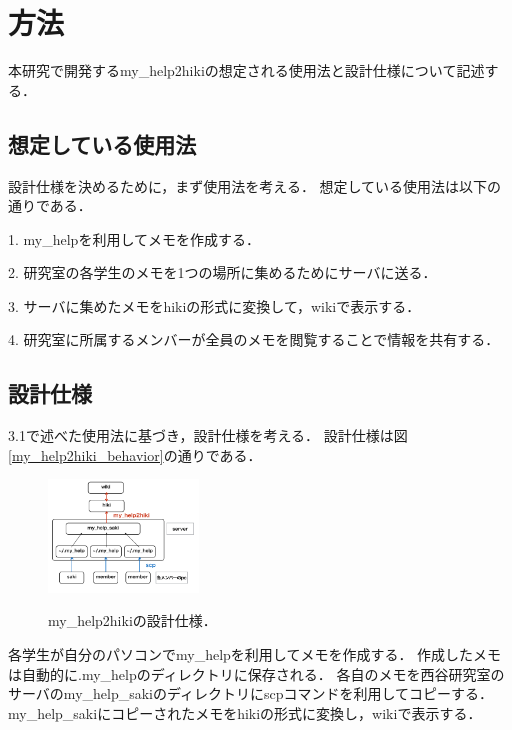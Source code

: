 \section{方法}
本研究で開発するmy\_help2hikiの想定される使用法と設計仕様について記述する．

\subsection{想定している使用法}
設計仕様を決めるために，まず使用法を考える．
想定している使用法は以下の通りである．
\begin{description}
\item 1. my\_helpを利用してメモを作成する．
\item 2. 研究室の各学生のメモを1つの場所に集めるためにサーバに送る．
\item 3. サーバに集めたメモをhikiの形式に変換して，wikiで表示する．
\item 4. 研究室に所属するメンバーが全員のメモを閲覧することで情報を共有する．
\end{description}

\subsection{設計仕様}
3.1で述べた使用法に基づき，設計仕様を考える．
設計仕様は図\ref{my_help2hiki_behavior}の通りである．

\begin{figure}[htbp]\begin{center}
\includegraphics[width=4cm,bb=100 100 600 900]{my_help2hiki_saki.010.png}
\caption{my\_help2hikiの設計仕様．}\label{my_help2hiki_behavior}
\label{default}\end{center}\end{figure}

各学生が自分のパソコンでmy\_helpを利用してメモを作成する．
作成したメモは自動的に.my\_helpのディレクトリに保存される．
各自のメモを西谷研究室のサーバのmy\_help\_sakiのディレクトリにscpコマンドを利用してコピーする．
my\_help\_sakiにコピーされたメモをhikiの形式に変換し，wikiで表示する．